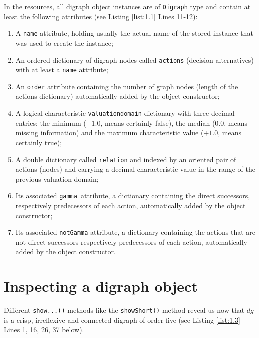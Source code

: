 In the \Digraph resources, all digraph object instances are of \texttt{Digraph} type and contain at least the following attributes (see Listing \ref{list:1.1}  Lines 11-12):
\begin{enumerate}
\item A \texttt{name} attribute, holding usually the actual name of the stored instance that was used to create the instance;
\item An ordered dictionary of digraph nodes called \texttt{actions} (decision alternatives) with at least a \texttt{name} attribute;
\item An \texttt{order} attribute containing the number of graph nodes (length of the actions dictionary) automatically added by the object constructor;
\item  A logical characteristic \texttt{valuationdomain} dictionary with three decimal entries: the minimum ($-1.0$, means certainly false), the median ($0.0$, means missing information) and the maximum characteristic value ($+1.0$, means certainly true);
\item A double dictionary called \texttt{relation} and indexed by an oriented pair of actions (nodes) and carrying a decimal characteristic value in the range of the previous valuation domain;
\item Its associated \texttt{gamma }attribute, a dictionary containing the direct successors, respectively predecessors of each action, automatically added by the object constructor;
\item Its associated \texttt{notGamma} attribute, a dictionary containing the actions that are not direct successors respectively predecessors of each action, automatically added by the object constructor.
\end{enumerate}

\section{Inspecting a digraph object}
\label{sec:1.4}

Different \texttt{show...()} methods like the \texttt{showShort()} method  reveal us now that $dg$ is a crisp, irreflexive and connected digraph of order five (see Listing \ref{list:1.3}  Lines 1, 16, 26, 37 below).


